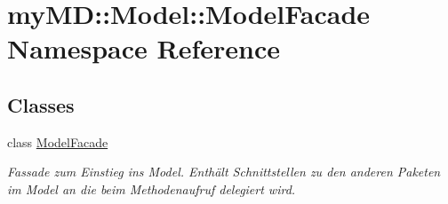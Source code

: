 \hypertarget{namespacemy_m_d_1_1_model_1_1_model_facade}{
\section{my\-MD::Model::Model\-Facade Namespace Reference}
\label{d8/d90/namespacemy_m_d_1_1_model_1_1_model_facade}
}


\subsection*{Classes}
\begin{CompactItemize}
\item 
class \hyperlink{classmy_m_d_1_1_model_1_1_model_facade_1_1_model_facade}{Model\-Facade}
\begin{CompactList}\small\item\em Fassade zum Einstieg ins Model. Enth\"{a}lt Schnittstellen zu den anderen Paketen im Model an die beim Methodenaufruf delegiert wird. \item\end{CompactList}\end{CompactItemize}
